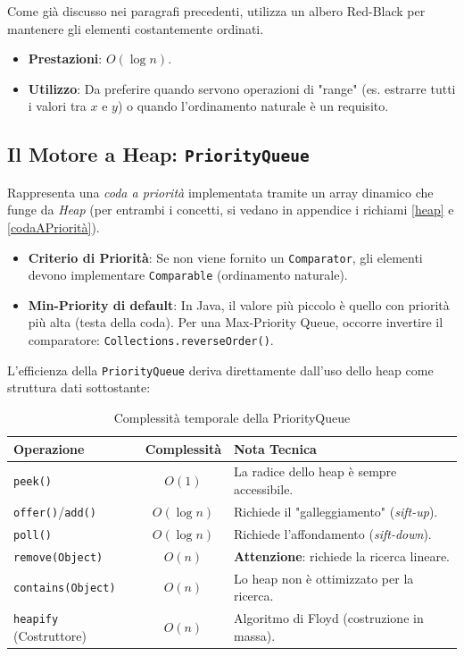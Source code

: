 Come già discusso nei paragrafi precedenti, utilizza un albero Red-Black per mantenere gli elementi costantemente ordinati.
\begin{itemize}
    \item \textbf{Prestazioni}: $O(\log n)$.
    \item \textbf{Utilizzo}: Da preferire quando servono operazioni di "range" (es. estrarre tutti i valori tra $x$ e $y$) o quando l'ordinamento naturale è un requisito.
\end{itemize}


\subsection{Il Motore a Heap: \texttt{PriorityQueue}}

Rappresenta una \textit{coda a priorità} implementata tramite un array dinamico che funge da \textit{Heap} (per entrambi i concetti, si vedano in appendice i richiami \ref{heap} e \ref{codaAPriorità}). 

\begin{itemize}
    \item \textbf{Criterio di Priorità}: Se non viene fornito un \texttt{Comparator}, gli elementi devono implementare \texttt{Comparable} (ordinamento naturale).
    \item \textbf{Min-Priority di default}: In Java, il valore più piccolo è quello con priorità più alta (testa della coda). Per una Max-Priority Queue, occorre invertire il comparatore: \texttt{Collections.reverseOrder()}.
\end{itemize}

\medskip

L'efficienza della \texttt{PriorityQueue} deriva direttamente dall'uso dello heap come struttura dati sottostante:

\begin{table}[ht]
\centering
\begin{tabular}{|l|c|l|}
\hline
\textbf{Operazione} & \textbf{Complessità} & \textbf{Nota Tecnica} \\ \hline
\texttt{peek()}     & $O(1)$               & La radice dello heap è sempre accessibile. \\ \hline
\texttt{offer()}/\texttt{add()} & $O(\log n)$      & Richiede il "galleggiamento" (\textit{sift-up}). \\ \hline
\texttt{poll()}     & $O(\log n)$          & Richiede l'affondamento (\textit{sift-down}). \\ \hline
\texttt{remove(Object)} & $O(n)$           & \textbf{Attenzione}: richiede la ricerca lineare. \\ \hline
\texttt{contains(Object)} & $O(n)$         & Lo heap non è ottimizzato per la ricerca. \\ \hline
\texttt{heapify} (Costruttore) & $O(n)$    & Algoritmo di Floyd (costruzione in massa). \\ \hline
\end{tabular}
\caption{Complessità temporale della PriorityQueue}
\end{table}

